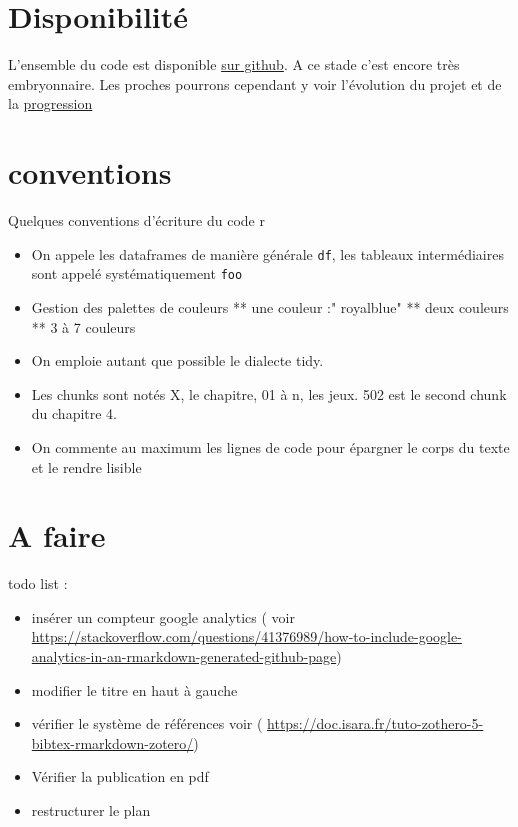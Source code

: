 \documentclass[
]{book}
\providecommand{\tightlist}{%
  \setlength{\itemsep}{0pt}\setlength{\parskip}{0pt}}
\begin{document}
\hypertarget{disponibilituxe9}{%
\section{Disponibilité}\label{disponibilituxe9}}

L'ensemble du code est disponible \href{https://github.com/BenaventC/NLPBook}{sur github}. A ce stade c'est encore très embryonnaire. Les proches pourrons cependant y voir l'évolution du projet et de la \href{https://benaventc.github.io/NLPBook/}{progression}

\hypertarget{conventions}{%
\section{conventions}\label{conventions}}

Quelques conventions d'écriture du code r

\begin{itemize}
\tightlist
\item
  On appele les dataframes de manière générale \texttt{df}, les tableaux intermédiaires sont appelé systématiquement \texttt{foo}
\item
  Gestion des palettes de couleurs
  ** une couleur :" royalblue"
  ** deux couleurs
  ** 3 à 7 couleurs
\item
  On emploie autant que possible le dialecte tidy.
\item
  Les chunks sont notés X, le chapitre, 01 à n, les jeux. 502 est le second chunk du chapitre 4.
\item
  On commente au maximum les lignes de code pour épargner le corps du texte et le rendre lisible
\end{itemize}

\hypertarget{a-faire}{%
\section{A faire}\label{a-faire}}

todo list :

\begin{itemize}
\tightlist
\item
  insérer un compteur google analytics ( voir \url{https://stackoverflow.com/questions/41376989/how-to-include-google-analytics-in-an-rmarkdown-generated-github-page})
\item
  modifier le titre en haut à gauche
\item
  vérifier le système de références voir ( \url{https://doc.isara.fr/tuto-zothero-5-bibtex-rmarkdown-zotero/})
\item
  Vérifier la publication en pdf
\item
  restructurer le plan
\end{itemize}
\end{document}
